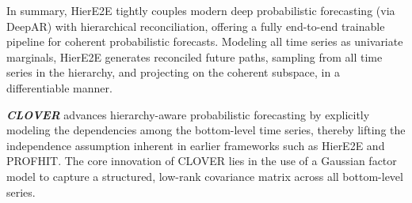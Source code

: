 \documentclass[letterpaper]{article}
\begin{document}
In summary, HierE2E tightly couples modern deep probabilistic forecasting (via DeepAR) with hierarchical reconciliation, offering a fully end-to-end trainable pipeline for coherent probabilistic forecasts. Modeling all time series as univariate marginals, HierE2E generates reconciled future paths, sampling from all time series in the hierarchy, and projecting on the coherent subspace, in a differentiable manner. 


\textit{\textbf{CLOVER}} advances hierarchy-aware probabilistic forecasting by explicitly modeling the dependencies among the bottom-level time series, thereby lifting the independence assumption inherent in earlier frameworks such as HierE2E and PROFHIT. The core innovation of CLOVER lies in the use of a Gaussian factor model to capture a structured, low-rank covariance matrix across all bottom-level series.
\end{document}

